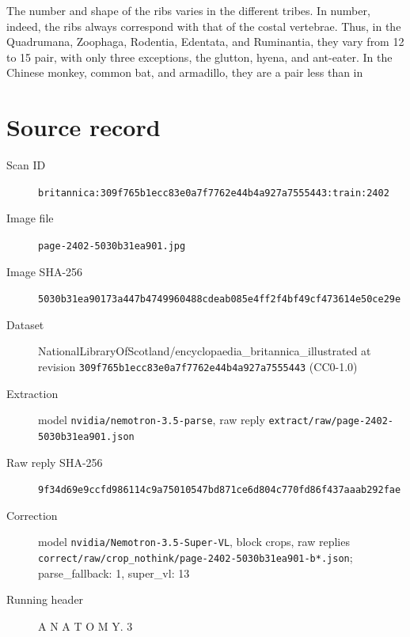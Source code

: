 \documentclass{article}
\begin{document}
The number and shape of the ribs varies in the different tribes. In number, indeed, the ribs always correspond with that of the costal vertebrae. Thus, in the Quadrumana, Zoophaga, Rodentia, Edentata, and Ruminantia, they vary from 12 to 15 pair, with only three exceptions, the glutton, hyena, and ant-eater. In the Chinese monkey, common bat, and armadillo, they are a pair less than in


\section*{Source record}
\begin{description}
\item[Scan ID] \texttt{britannica:309f765b1ecc83e0a7f7762e44b4a927a7555443:train:2402}
\item[Image file] \texttt{page-2402-5030b31ea901.jpg}
\item[Image SHA-256] \texttt{5030b31ea90173a447b4749960488cdeab085e4ff2f4bf49cf473614e50ce29e}
\item[Dataset] NationalLibraryOfScotland/encyclopaedia\_britannica\_illustrated at revision \texttt{309f765b1ecc83e0a7f7762e44b4a927a7555443} (CC0-1.0)
\item[Extraction] model \texttt{nvidia/nemotron-3.5-parse}, raw reply \texttt{extract/raw/page-2402-5030b31ea901.json}
\item[Raw reply SHA-256] \texttt{9f34d69e9ccfd986114c9a75010547bd871ce6d804c770fd86f437aaab292fae}
\item[Correction] model \texttt{nvidia/Nemotron-3.5-Super-VL}, block crops, raw replies \texttt{correct/raw/crop\_nothink/page-2402-5030b31ea901-b*.json}; parse\_fallback: 1, super\_vl: 13
\item[Running header] A N A T O M Y. 3
\end{description}
\end{document}
